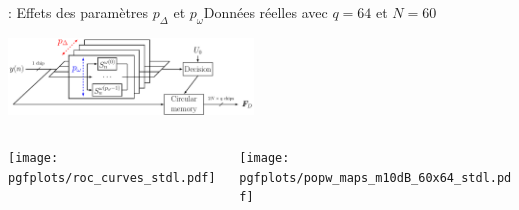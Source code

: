 \documentclass[../main.tex]{subfiles}
\begin{document}
\begin{frame}{\subsecname : {Effets des paramètres $p_\Delta$ et $p_\omega$}}{Données réelles avec $q = 64$ et $N = 60$}
  \begin{overlayarea}{\linewidth}{.15\textheight} \vspace {-1.2cm}
    \hfill \includegraphics[width=6.5cm, height=.75\textheight, keepaspectratio=true]{figures/tikzpicture/funct_view_detection_stdl.pdf}
  \end{overlayarea}
  \begin{columns}
    \begin{column}{.65\linewidth}
      \begin{overlayarea}{\linewidth}{.75\textheight} \vspace {-.5cm}
        \texttt{[image: pgfplots/roc\_curves\_stdl.pdf]}
      \end{overlayarea}
    \end{column}
    \begin{column}{.35\linewidth} \vspace {-.5cm}
      \texttt{[image: pgfplots/popw\_maps\_m10dB\_60x64\_stdl.pdf]}
    \end{column}
  \end{columns}
\end{frame}

\end{document}

